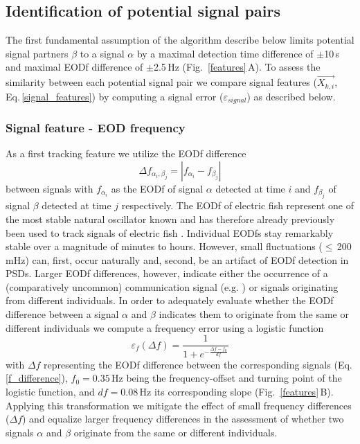 \documentclass[11pt,pdftex]{article}
\newcommand{\panel}[1]{\textsf{#1}}
\newcommand{\subfref}[2]{\textup{\ref{#1}}\,\panel{#2}}
\newcommand{\fig}{Fig.}
\newcommand{\subfigref}[2]{\fig~\subfref{#1}{#2}}
\newcommand{\eqnref}[1]{Eq.\,\ref{#1}}
\begin{document}
\subsection{Identification of potential signal pairs}

The first fundamental assumption of the algorithm describe below limits potential signal partners $\beta$ to a signal $\alpha$ by a maximal detection time difference of $\pm$10\,s and maximal EODf difference of $\pm$2.5\,Hz (\subfigref{features}{A}). To assess the similarity between each potential signal pair we compare signal features ($\vec{X_{k, i}}$, \eqnref{signal_features}) by computing a signal error ($\varepsilon_{signal}$) as described below.

\subsubsection{Signal feature - EOD frequency}
As a first tracking feature we utilize the EODf difference 
\begin{equation}\label{f_difference}
\Delta f_{\alpha_i, \beta_j} = | f_{\alpha_i} - f_{\beta_j} |
\end{equation}
between signals with $f_{\alpha_i}$ as the EODf of signal $\alpha$ detected at time $i$ and $f_{\beta_j}$ of signal $\beta$ detected at time $j$ respectively. The EODf of electric fish represent one of the most stable natural oscillator known \citep{Moortgat1998} and has therefore already previously been used to track signals of electric fish \citep{Henninger2020}. Individual EODfs stay remarkably stable over a magnitude of minutes to hours. However, small fluctuations ($\leq$\,200\,mHz) can, first, occur naturally and, second, be an artifact of EODf detection in PSDs. Larger EODf differences, however, indicate either the occurrence of a (comparatively uncommon) communication signal (e.g. \citealp{Zupanc2002, Triefenbach2008, Raab2021}) or signals originating from different individuals. In order to adequately evaluate whether the EODf difference between a signal $\alpha$ and $\beta$ indicates them to originate from the same or different individuals we compute a frequency error using a logistic function 
\begin{equation}\label{errpr_eodf_eq}   
  \varepsilon_{f}(\Delta f) = \frac{1}{1 + e^{-\frac{\Delta f - f_0}{df}}}
\end{equation}
with $\Delta f$ representing the EODf difference between the corresponding signals (\eqnref{f_difference}), $f_0 = 0.35$\,Hz being the frequency-offset and turning point of the logistic function, and $df = 0.08$\,Hz its corresponding slope (\subfigref{features}{B}). Applying this transformation we mitigate the effect of small frequency differences ($\Delta f$) and equalize larger frequency differences in the assessment of whether two signals $\alpha$ and $\beta$ originate from the same or different individuals. 
\end{document}
